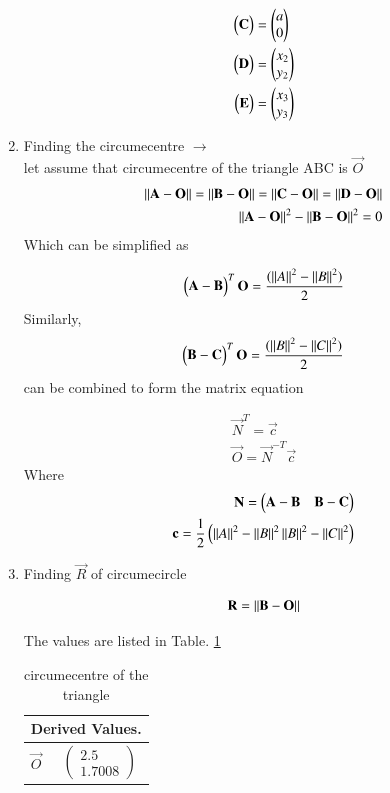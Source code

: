 \begin{enumerate}[label=\thesection.\arabic*.,ref=\thesection.\theenumi]
\begin{align}
\begin{pmatrix}\mathbf{C}\end{pmatrix} &= \begin{pmatrix}a\\ 0\end{pmatrix}
\\
\begin{pmatrix}\mathbf{D}\end{pmatrix} &= \begin{pmatrix}x_2 \\ y_2\end{pmatrix}
\\
\begin{pmatrix}\mathbf{E}\end{pmatrix} &= \begin{pmatrix}x_3 \\ y_3\end{pmatrix}
\end{align}
\item Finding the circumecentre $\to$
\\
let assume that circumecentre of the triangle ABC is $\vec{O}$
\begin{align}
\left\lVert\mathbf{A}-\mathbf{O}\right\rVert = \left\lVert\mathbf{B}-\mathbf{O}\right\rVert = \left\lVert\mathbf{C}-\mathbf{O}\right\rVert = \left\lVert\mathbf{D}-\mathbf{O}\right\rVert
\\
\left\lVert\mathbf{A}-\mathbf{O}\right\rVert^2 - \left\lVert\mathbf{B}-\mathbf{O}\right\rVert^2 = 0
\end{align}
Which can be simplified as

\begin{align}
\begin{pmatrix}\mathbf{A}-\mathbf{B}\end{pmatrix}^T \mathbf{O} = \frac{(\left\lVert A\right\rVert^2 -\left\lVert B\right\rVert^2)}{2}
\end{align}
Similarly,
\begin{align}
\begin{pmatrix}\mathbf{B}-\mathbf{C}\end{pmatrix}^T \mathbf{O} = \frac{(\left\lVert B\right\rVert^2 -\left\lVert C\right\rVert^2)}{2}
\end{align}
can be combined to form the matrix equation 

\begin{align}
\vec{N}^T = \vec{c}
\\
\vec{O} = \vec{N}^{-T} \vec{c}
\end{align}
Where
\begin{align}
\mathbf{N} = \begin{pmatrix}\mathbf{A} -\mathbf{B} & \mathbf{B} -\mathbf{C}\end{pmatrix}
\\
\mathbf{c} = \frac{1}{2}\begin{pmatrix}\left\lVert A\right\rVert^2 -\left\lVert B\right\rVert^2  \left\lVert B\right\rVert^2 - \left\lVert C\right\rVert^2\end{pmatrix}
\end{align}
\item  Finding $\vec{R}$ of circumecircle

\begin{align}
\mathbf{R} = \left\lVert\mathbf{B}- \mathbf{O}\right\rVert
\end{align}
 

The values are listed in 
Table. \ref{table:table2} 
\begin{table}[ht!]
\centering
\begin{tabular}{ |p{3cm}|p{3cm}|  }
\hline
 \multicolumn{2}{|c|}{Derived Values.} \\
\hline
$\vec{O}$ & $$\begin{pmatrix}2.5\\1.7008\end{pmatrix}$$\\						
\hline
\end{tabular}
\caption{circumecentre of the triangle}
\label{table:table2}
\end{table}



\end{enumerate}
